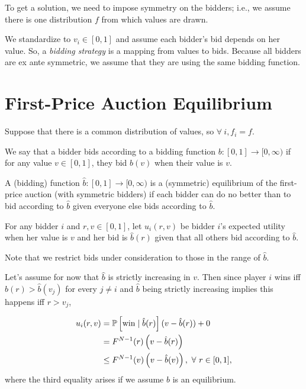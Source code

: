 
To get a solution, we need to impose symmetry on the bidders; i.e., we assume there is one distribution $f$ from which values are drawn.

We standardize to $v_i \in [0,1]$ and assume each bidder's bid depends on her value. So, a \emph{bidding strategy} is a mapping from values to bids. Because all bidders are ex ante symmetric, we assume that they are using the same bidding function.

\section{First-Price Auction Equilibrium}

Suppose that there is a common distribution of values, so $\forall\ i, f_i = f$.

\begin{definition}
	We say that a bidder bids according to a bidding function $b: [0,1] \to [0,\infty)$ if for any value $v \in [0,1]$, they bid $b(v)$ when their value is $v$.
\end{definition}

\begin{definition}
	A (bidding) function $\hat{b}: [0,1] \to [0,\infty)$ is a (symmetric) equilibrium of the first-price auction (with symmetric bidders) if each bidder can do no better than to bid according to $\hat{b}$ given everyone else bids according to $\hat{b}$.
\end{definition}

\begin{notation}	For any bidder $i$ and $r,v \in [0,1]$, let $u_i(r,v)$ be bidder $i$'s expected utility when her value is $v$ and her bid is $\hat{b}(r)$ given that all others bid according to $\hat{b}$.

	Note that we restrict bids under consideration to those in the range of $\hat{b}$.
\end{notation}

Let's assume for now that $\hat{b}$ is strictly increasing in $v$.
Then since player $i$ wins iff $\hat{b}(r) > \hat{b}(v_j)$ for every $j \ne i$ and $\hat{b}$ being strictly increasing implies this happens iff $r > v_j$,

\begin{align*}
	u_i(r,v) &= \P\left[\text{win}\mid \hat{b}(r)\right](v-\hat{b}(r)) + 0 \\
			 &= F^{N-1}(r) \left( v- \hat{b}(r) \right) \\
			 &\le F^{N-1}(v) \left(v- \hat{b}(v)\right),\ \forall\ r \in [0,1]
,\end{align*}
where the third equality arises if we assume $\hat{b}$ is an equilibrium.

